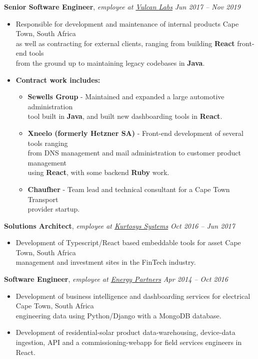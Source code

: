 \documentclass[9pt]{extarticle}
\begin{document}
\noindent
{\bf Senior Software Engineer}, \textit{employee at \href{https://vulcanlabs.com/}{Vulcan Labs}}  \hfill \textit{Jun 2017 -- Nov 2019}
\begin{itemize}
\setlength\itemsep{0.05em}

\item Responsible for development and maintenance of internal products \hfill Cape Town, South Africa \\
as well as contracting for external clients, ranging from building \textbf{React} front-end tools \\
from the ground up to maintaining legacy codebases in \textbf{Java}.
\item \textbf{Contract work includes:}
  \begin{itemize}
    \item \textbf{Sewells Group} - Maintained and expanded a large automotive administration \\
    tool built in \textbf{Java}, and built new dashboarding tools in \textbf{React}.
    \item \textbf{Xneelo (formerly Hetzner SA)} - Front-end development of several tools ranging \\
    from DNS management and mail administration to customer product management \\
    using \textbf{React}, with some backend \textbf{Ruby} work.
    \item \textbf{Chaufher} - Team lead and technical consultant for a Cape Town Transport \\
    provider startup.
  \end{itemize}
\end{itemize}

\noindent
{\bf Solutions Architect}, \textit{employee at \href{https://www.kurtosys.com/}{Kurtosys Systems}}  \hfill \textit{Oct 2016 -- Jun 2017}
\begin{itemize}
\setlength\itemsep{0.05em}
\item Development of Typescript/React based embeddable tools for asset \hfill Cape Town, South Africa \\
management and investment sites in the FinTech industry.
\end{itemize}

\noindent
{\bf Software Engineer}, \textit{employee at \href{https://energypartners.co.za/}{Energy Partners}}  \hfill \textit{Apr 2014 -- Oct 2016}
\begin{itemize}
\setlength\itemsep{0.05em}
\item Development of business intelligence and dashboarding services for electrical \hfill Cape Town, South Africa \\
engineering data using Python/Django with a MongoDB database.
\item Development of residential-solar product data-warehousing, device-data \\
ingestion, API and a commissioning-webapp for field services engineers in React.

\end{itemize}
\end{document}
